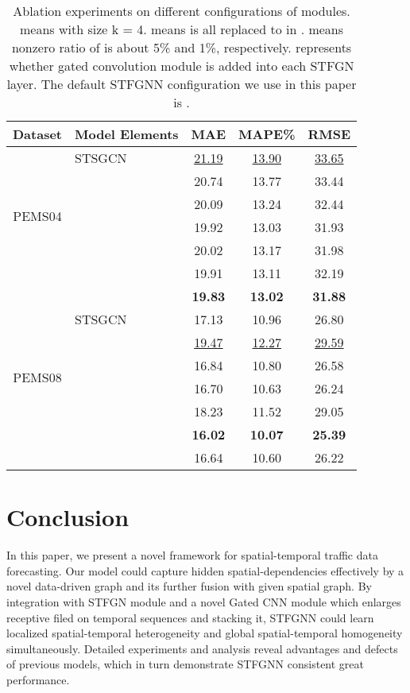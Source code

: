 \documentclass[letterpaper]{article} \usepackage{aaai21}  \usepackage{times}  \usepackage{helvet} \usepackage{courier}  \usepackage[hyphens]{url}  \usepackage{graphicx} \urlstyle{rm} \def\UrlFont{\rm}  \usepackage{natbib}  \usepackage{caption} \frenchspacing  \setlength{\pdfpagewidth}{8.5in}  \setlength{\pdfpageheight}{11in}  \usepackage{multirow}
\begin{document}
\begin{table}[]
	\begin{tabular}{clccc}
		\hline
		Dataset                 & Model Elements    & MAE            & MAPE\%         & RMSE           \\ \hline
		\multirow{6}{*}{PEMS04}
		& STSGCN        & \underline{21.19}          & \underline{13.90}          & \underline{33.65}          \\
		&      & 20.74          & 13.77          & 33.44          \\
		&      & 20.09          & 13.24          & 32.44          \\
		&            & 19.92          & 13.03          & 31.93          \\
		&  & 20.02               & 13.17               & 31.98               \\
		&  & 19.91        & 13.11               & 32.19               \\
		&  & \textbf{19.83} & \textbf{13.02} & \textbf{31.88} \\ \hline
		\multirow{6}{*}{PEMS08} & STSGCN        & 17.13          & 10.96          & 26.80          \\
		&       & \underline{19.47}          & \underline{12.27}          & \underline{29.59}          \\
		&      & 16.84          & 10.80          & 26.58          \\
		&           & 16.70          & 10.63          & 26.24          \\
		&  & 18.23              & 11.52               & 29.05               \\
		&   & \textbf{16.02}               & \textbf{10.07}               & \textbf{25.39}               \\ 
		&   & 16.64 & 10.60 & 26.22 \\ \hline
	\end{tabular}
	\caption{Ablation experiments on different configurations of modules.  means  with size k = 4.  means  is all replaced to  in .  means nonzero ratio of  is about 5\% and 1\%, respectively.  represents whether gated convolution module is added into each STFGN layer. The default STFGNN configuration we use in this paper is .}
	\label{tab:ablation}
\end{table}

\section{Conclusion}
In this paper, we present a novel framework for spatial-temporal traffic data forecasting. Our model could capture hidden spatial-dependencies effectively by a novel data-driven graph and its further fusion with given spatial graph. By integration with STFGN module and a novel Gated CNN module which enlarges receptive filed on temporal sequences and stacking it, STFGNN could learn localized spatial-temporal heterogeneity and global spatial-temporal homogeneity simultaneously. Detailed experiments and analysis reveal advantages and defects of previous models, which in turn demonstrate STFGNN consistent great performance.
\end{document}
